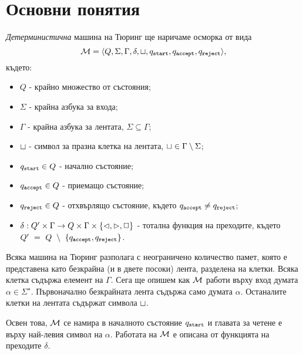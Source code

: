 \section{Основни понятия}
{\em Детерминистична} машина на Тюринг ще наричаме осморка от вида 
\[\mathcal{M} = \langle{Q,\Sigma,\Gamma,\delta,\sqcup,q_{\texttt{start}},q_{\texttt{accept}}, q_{\texttt{reject}}}\rangle,\] където:
\begin{itemize}
\item 
  $Q$ - крайно множество от състояния;
\item
  $\Sigma$ - крайна азбука за входа;
\item
  $\Gamma$ - крайна азбука за лентата, $\Sigma \subseteq \Gamma$;

\item
  $\sqcup$ - символ за празна клетка на лентата,  $\sqcup \in \Gamma \setminus \Sigma$;
\item
  $q_{\texttt{start}} \in Q$ - начално състояние;
\item
  $q_{\texttt{accept}} \in Q$ - приемащо състояние;
\item
  $q_{\texttt{reject}} \in Q$ - отхвърлящо състояние, където $q_{\texttt{accept}} \neq q_{\texttt{reject}}$;
\item
  $\delta:Q'\times\Gamma \to Q\times \Gamma \times \{\lhd,\rhd,\Box\}$ - тотална функция на преходите, където\\
  $Q'~=~Q~\setminus~\{q_{\texttt{accept}}, q_{\texttt{reject}}\}$.
\end{itemize}

Всяка машина на Тюринг разполага с неограничено количество памет, която е представена като безкрайна (и в двете посоки) лента, разделена на клетки.
Всяка клетка съдържа елемент на $\Gamma$.
Сега ще опишем как $\mathcal{M}$ работи върху вход думата $\alpha \in \Sigma^\star$.
Първоначално безкрайната лента съдържа само думата $\alpha$. Останалите клетки на лентата съдържат символа $\sqcup$.

Освен това, $\mathcal{M}$ се намира в началното състояние $q_{\texttt{start}}$ и главата за четене е върху най-левия символ на $\alpha$.
Работата на $\mathcal{M}$ е описана от функцията на преходите $\delta$.
  
